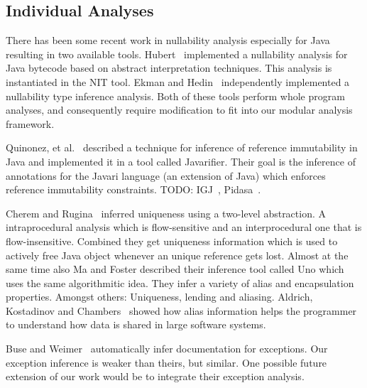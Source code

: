 \subsection{Individual Analyses}

There has been some recent work in nullability analysis especially for Java resulting in two available tools.  Hubert~\cite{NIT} implemented a nullability analysis for Java bytecode based on abstract interpretation techniques.  This analysis is instantiated in the {\sc NIT} tool.  Ekman and Hedin~\cite{NonNullTypeInference} independently implemented a nullability type inference analysis.  Both of these tools perform whole program analyses, and consequently require modification to fit into our modular analysis framework.

Quinonez, et al.~\cite{Javarifier} described a technique for inference of
reference immutability in Java and implemented it in a tool called {\sc
  Javarifier}. Their goal is the inference of annotations for the {\sc Javari}
language (an extension of Java) which enforces reference immutability
constraints. TODO: IGJ~\cite{IGJ}, Pidasa~\cite{Pidasa}.

Cherem and Rugina~\cite{UniquenessInference} inferred uniqueness using a two-level
abstraction. A intraprocedural analysis which is flow-sensitive and an interprocedural
one that is flow-insensitive. Combined they get uniqueness information
which is used to actively free Java object whenever an unique reference gets lost.
Almost at the same time also Ma and Foster described their inference tool called
Uno which uses the same algorithmitic idea. They infer a variety of alias and encapsulation
properties. Amongst others: Uniqueness, lending and aliasing.
Aldrich, Kostadinov and Chambers~\cite{AliasJava} showed how alias information 
helps the programmer to understand how data is shared in large software systems.

Buse and Weimer~\cite{autodoc} automatically infer documentation for
exceptions.  Our exception inference is weaker than theirs, but similar.  One
possible future extension of our work would be to integrate their exception
analysis.
